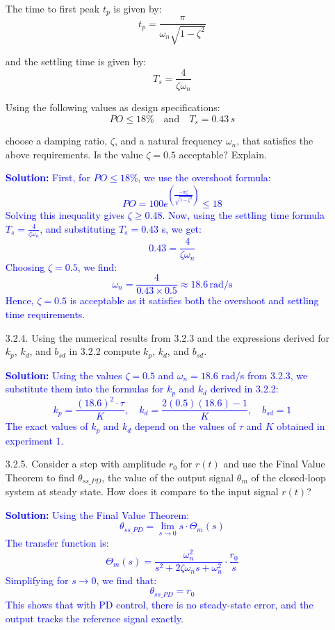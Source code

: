 \documentclass{article}
\begin{document}
\begin{itemize}
    The time to first peak $t_p$ is given by:
    \begin{equation}
        t_p = \frac{\pi}{\omega_n \sqrt{1-\zeta^2}}
    \end{equation}
    
    and the settling time is given by:
    \begin{equation}
        T_s = \frac{4}{\zeta \omega_n}
    \end{equation}
    
    Using the following values as design specifications:
    \begin{equation}
        PO \leq 18\% \quad \text{and} \quad T_s = 0.43 \, s
    \end{equation}
    
    choose a damping ratio, $\zeta$, and a natural frequency $\omega_n$, that satisfies the above requirements. Is the value $\zeta = 0.5$ acceptable? Explain.
    
    \textcolor{blue}{\textbf{Solution:} First, for $PO \leq 18\%$, we use the overshoot formula:
    \[
    PO = 100 e^{\left(\frac{-\pi \zeta}{\sqrt{1-\zeta^2}}\right)} \leq 18
    \]
    Solving this inequality gives $\zeta \geq 0.48$. Now, using the settling time formula $T_s = \frac{4}{\zeta \omega_n}$, and substituting $T_s = 0.43$ s, we get:
    \[
    0.43 = \frac{4}{\zeta \omega_n}
    \]
    Choosing $\zeta = 0.5$, we find:
    \[
    \omega_n = \frac{4}{0.43 \times 0.5} \approx 18.6 \, \text{rad/s}
    \]
    Hence, $\zeta = 0.5$ is acceptable as it satisfies both the overshoot and settling time requirements.}

    \item[3.2.4.] Using the numerical results from 3.2.3 and the expressions derived for $k_p$, $k_d$, and $b_{sd}$ in 3.2.2 compute $k_p$, $k_d$, and $b_{sd}$.

    \textcolor{blue}{\textbf{Solution:} Using the values $\zeta = 0.5$ and $\omega_n = 18.6$ rad/s from 3.2.3, we substitute them into the formulas for $k_p$ and $k_d$ derived in 3.2.2:
    \[
    k_p = \frac{(18.6)^2 \cdot \tau}{K}, \quad k_d = \frac{2(0.5)(18.6) - 1}{K}, \quad b_{sd} = 1
    \]
    The exact values of $k_p$ and $k_d$ depend on the values of $\tau$ and $K$ obtained in experiment 1.}

    \item[3.2.5.] Consider a step with amplitude $r_0$ for $r(t)$ and use the Final Value Theorem to find $\theta_{ss\_ PD}$, the value of the output signal $\theta_m$ of the closed-loop system at steady state. How does it compare to the input signal $r(t)$?

    \textcolor{blue}{\textbf{Solution:} Using the Final Value Theorem:
    \[
    \theta_{ss\_ PD} = \lim_{s \to 0} s \cdot \Theta_m(s)
    \]
    The transfer function is:
    \[
    \Theta_m(s) = \frac{\omega_n^2}{s^2 + 2\zeta \omega_n s + \omega_n^2} \cdot \frac{r_0}{s}
    \]
    Simplifying for $s \to 0$, we find that:
    \[
    \theta_{ss\_ PD} = r_0
    \]
    This shows that with PD control, there is no steady-state error, and the output tracks the reference signal exactly.}
\end{itemize}
\end{document}
